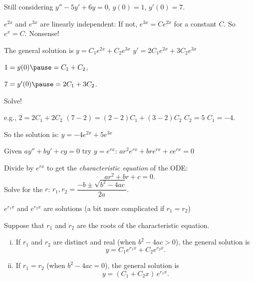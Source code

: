\documentclass[10pt,aspectratio=169]{beamer}
\begin{document}
\begin{frame}
Still considering
\qquad $y''-5y'+6y = 0$, \qquad $y(0) = 1$, \qquad $y'(0) = 7$.

\medskip

$e^{2x}$ and $e^{3x}$ are linearly independent:
\pause
If not, $e^{3x} = C e^{2x}$ for a constant $C$.
\pause
So $e^x = C$.
\pause
Nonsense!

\medskip
\pause

The general solution is \quad $y = C_1 e^{2x} + C_2 e^{3x}$
\pause
\qquad
$y' = 2 C_1 e^{2x} + 3 C_2 e^{3x}$

\medskip
\pause

$1 = y(0) \pause = C_1 + C_2$,

\medskip
\pause

$7 = y'(0) \pause = 2 C_1 + 3 C_2$.

\medskip
\pause

Solve!

\pause
e.g., $2 = 2C_1 + 2C_2$
\pause\wthus
$(7-2) = (2-2)C_1 + (3-2)C_2$
\pause
\wthus
$C_2 = 5$
\pause
\wthus
$C_1 = -4$.

\medskip
\pause

So the solution is: \quad
$y = -4 e^{2x} + 5 e^{3x}$

\end{frame}

\begin{frame}
Given
\quad
$a y'' + b y' + c y = 0$
\qquad
\pause
try $y = e^{rx}$:
\quad
$a r^2 e^{rx} + 
b r e^{rx} + 
c e^{rx} = 0$

\medskip
\pause
Divide by $e^{rx}$ to get the
\emph{characteristic equation} of the ODE:
\[
a r^2 + 
b r + 
c = 0 .
\]
\pause
Solve for the $r$:
\qquad 
$r_1, r_2 = \dfrac{-b \pm \sqrt{b^2 - 4ac}}{2a}$.

\medskip
\pause

\wthus $e^{r_1 x}$ and $e^{r_2 x}$ are solutions (a bit more complicated if
$r_1=r_2$)

\pause
\begin{theorem}
Suppose that $r_1$ and $r_2$ are the roots of the characteristic equation.
\begin{enumerate}[(i)]
\item\pause
If $r_1$ and $r_2$ are distinct and real (when $b^2 - 4ac > 0$),
the general solution is
\[
y = C_1 e^{r_1 x} + C_2 e^{r_2 x} .
\]
\item
\pause
If $r_1 = r_2$ (when $b^2 - 4ac = 0$), 
the general solution is
\[
y = (C_1 + C_2 x)\, e^{r_1 x} .
\]
\end{enumerate}
\end{theorem}
\end{frame}
\end{document}
